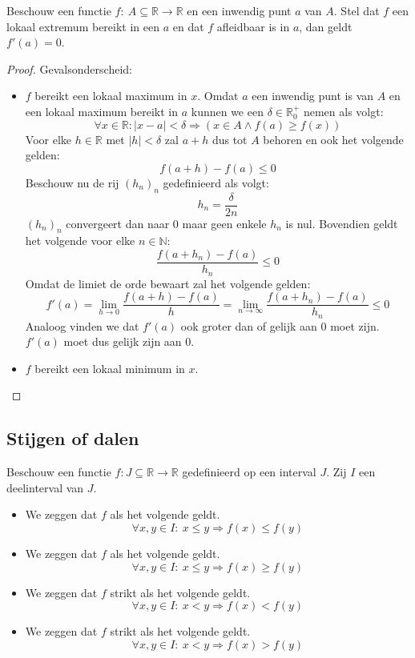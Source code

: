 \documentclass[main.tex]{subfiles}
\begin{document}
\begin{pr}
  Beschouw een functie $f:\ A \subseteq \mathbb{R} \rightarrow \mathbb{R}$ en een inwendig punt $a$ van $A$.
  Stel dat $f$ een lokaal extremum bereikt in een $a$ en dat $f$ afleidbaar is in $a$, dan geldt $f'(a) = 0$.

  \begin{proof}
    Gevalsonderscheid:
    \begin{itemize}
    \item $f$ bereikt een lokaal maximum in $x$.
      Omdat $a$ een inwendig punt is van $A$ en een lokaal maximum bereikt in $a$ kunnen we een $\delta \in \mathbb{R}_{0}^{+}$ nemen als volgt:
      \[ \forall x\in \mathbb{R}: |x-a| < \delta \Rightarrow (x\in A \wedge f(a) \ge f(x)) \]
      Voor elke $h\in \mathbb{R}$ met $|h| < \delta$ zal $a+h$ dus tot $A$ behoren en ook het volgende gelden:
      \[ f(a+h) -f(a) \le 0 \]
      Beschouw nu de rij $(h_{n})_{n}$ gedefinieerd als volgt:
      \[ h_{n} = \frac{\delta}{2n} \]
      $(h_{n})_{n}$ convergeert dan naar $0$ maar geen enkele $h_{n}$ is nul.
      Bovendien geldt het volgende voor elke $n\in \mathbb{N}$:
      \[ \frac{f(a+h_{n}) -f(a)}{h_{n}} \le 0 \]
      Omdat de limiet de orde bewaart zal het volgende gelden:
      \[ f'(a) = \lim_{h\rightarrow 0}\frac{f(a+h)-f(a)}{h} = \lim_{n \rightarrow \infty}\frac{f(a+h_{n})-f(a)}{h_{n}} \le 0 \]
      Analoog vinden we dat $f'(a)$ ook groter dan of gelijk aan $0$ moet zijn.
      $f'(a)$ moet dus gelijk zijn aan $0$.
    \item $f$ bereikt een lokaal minimum in $x$.
    \end{itemize}
  \end{proof}
\end{pr}

\subsection{Stijgen of dalen}
\label{sec:stijgen-dalen}

\begin{de}
  Beschouw een functie $f: J \subseteq \mathbb{R} \rightarrow \mathbb{R}$ gedefinieerd op een interval $J$.
  Zij $I$ een deelinterval van $J$.
  \begin{itemize}
  \item We zeggen dat $f$  als het volgende geldt.
    \[ \forall x,y \in I:\ x \le y \Rightarrow f(x) \le f(y) \]
  \item We zeggen dat $f$  als het volgende geldt.
    \[ \forall x,y \in I:\ x \le y \Rightarrow f(x) \ge f(y) \]
  \item We zeggen dat $f$ strikt  als het volgende geldt.
    \[ \forall x,y \in I:\ x < y \Rightarrow f(x) < f(y) \]
  \item We zeggen dat $f$ strikt  als het volgende geldt.
    \[ \forall x,y \in I:\ x < y \Rightarrow f(x) > f(y) \]
  \end{itemize}
\end{de}
\end{document}

